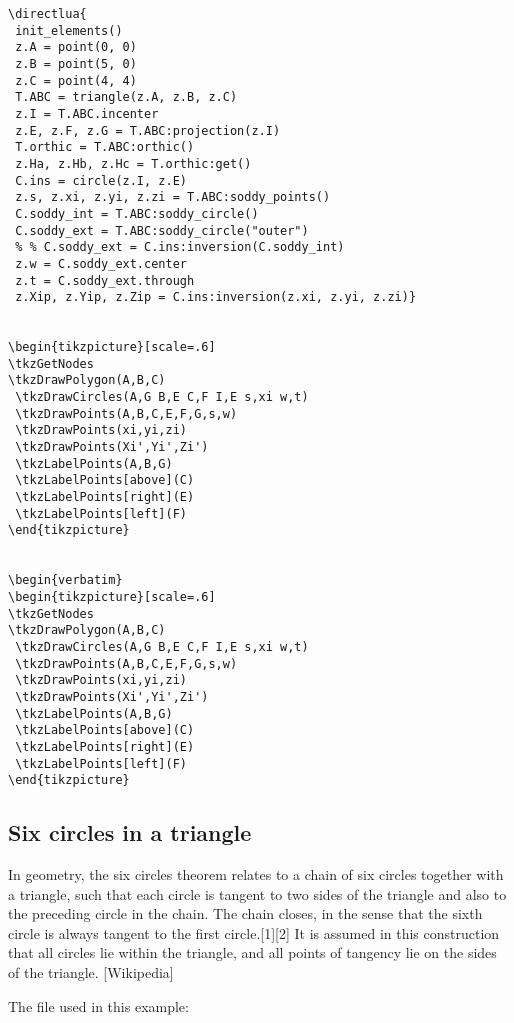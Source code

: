 \begin{verbatim}
\directlua{
 init_elements()
 z.A = point(0, 0)
 z.B = point(5, 0)
 z.C = point(4, 4)
 T.ABC = triangle(z.A, z.B, z.C)
 z.I = T.ABC.incenter
 z.E, z.F, z.G = T.ABC:projection(z.I)
 T.orthic = T.ABC:orthic()
 z.Ha, z.Hb, z.Hc = T.orthic:get()
 C.ins = circle(z.I, z.E)
 z.s, z.xi, z.yi, z.zi = T.ABC:soddy_points()
 C.soddy_int = T.ABC:soddy_circle()
 C.soddy_ext = T.ABC:soddy_circle("outer")
 % % C.soddy_ext = C.ins:inversion(C.soddy_int)
 z.w = C.soddy_ext.center
 z.t = C.soddy_ext.through
 z.Xip, z.Yip, z.Zip = C.ins:inversion(z.xi, z.yi, z.zi)}


\begin{tikzpicture}[scale=.6]
\tkzGetNodes
\tkzDrawPolygon(A,B,C)
 \tkzDrawCircles(A,G B,E C,F I,E s,xi w,t)
 \tkzDrawPoints(A,B,C,E,F,G,s,w)
 \tkzDrawPoints(xi,yi,zi)
 \tkzDrawPoints(Xi',Yi',Zi')
 \tkzLabelPoints(A,B,G)
 \tkzLabelPoints[above](C)
 \tkzLabelPoints[right](E)
 \tkzLabelPoints[left](F)
\end{tikzpicture}


\begin{verbatim}
\begin{tikzpicture}[scale=.6]
\tkzGetNodes
\tkzDrawPolygon(A,B,C)
 \tkzDrawCircles(A,G B,E C,F I,E s,xi w,t)
 \tkzDrawPoints(A,B,C,E,F,G,s,w)
 \tkzDrawPoints(xi,yi,zi)
 \tkzDrawPoints(Xi',Yi',Zi')
 \tkzLabelPoints(A,B,G)
 \tkzLabelPoints[above](C)
 \tkzLabelPoints[right](E)
 \tkzLabelPoints[left](F)
\end{tikzpicture}
\end{verbatim}



\subsection{Six circles in a triangle} %
\label{sub:six_circles_in_a_triangle}
In geometry, the six circles theorem relates to a chain of six circles together with a triangle, such that each circle is tangent to two sides of the triangle and also to the preceding circle in the chain. The chain closes, in the sense that the sixth circle is always tangent to the first circle.[1][2] It is assumed in this construction that all circles lie within the triangle, and all points of tangency lie on the sides of the triangle. [Wikipedia]

\vspace{1em}
The file  used in this example:

